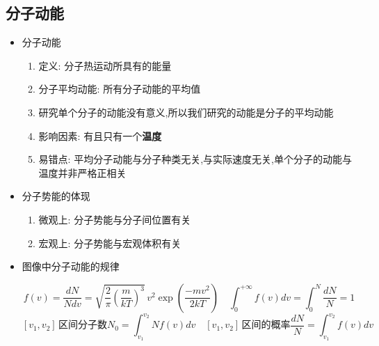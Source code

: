 \documentclass{article}
\begin{document}
\vspace{2em}

\subsection{分子动能}
\begin{itemize}
    \item 分子动能
          \begin{enumerate}[label = (\arabic*)]
              \item 定义: 分子热运动所具有的能量
              \item 分子平均动能: 所有分子动能的平均值
              \item 研究单个分子的动能没有意义,所以我们研究的动能是分子的平均动能
              \item 影响因素: 有且只有一个\textbf{温度}
              \item 易错点: 平均分子动能与分子种类无关,与实际速度无关,单个分子的动能与温度并非严格正相关
          \end{enumerate}
    \item 分子势能的体现
          \begin{enumerate}[label = (\arabic*)]
              \item 微观上: 分子势能与分子间位置有关
              \item 宏观上: 分子势能与宏观体积有关
          \end{enumerate}
    \item 图像中分子动能的规律

          \vspace{-1em}
          \begin{adjustbox}{minipage=0.91\linewidth, bgcolor=gray!20, padding=1em}
              \small %
              $$ f(v)= \frac{dN}{Ndv} ={\sqrt {{\frac {2}{\pi }}\left({\frac {m}{kT}}\right)^{3}}}\,v^{2}\exp \left({\frac {-mv^{2}}{2kT}}\right)  \quad
                  \int_{0}^{+\infty} f(v) dv  = \int_{0}^{N} \frac{dN}{N} = 1
              $$
              $$
                  [v_{1},v_{2}] \, \text{区间分子数} N_{0} = \int_{v_{1}}^{v_{2}} N f(v) dv  \quad [v_{1},v_{2}] \, \text{区间的概率} \frac{dN}{N} = \int_{v_{1}}^{v_{2}} f(v) dv
              $$
          \end{adjustbox}
          \vspace{-1em}


\end{itemize}
\end{document}
